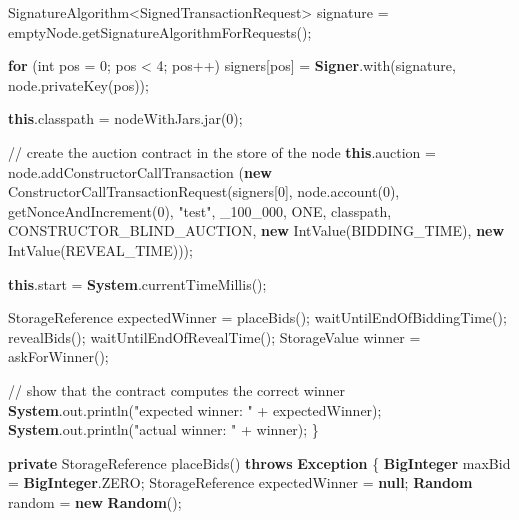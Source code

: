\documentclass[a4paper,]{book}
\newenvironment{Shaded}{\begin{snugshade}}{\end{snugshade}}
\newcommand{\BuiltInTok}[1]{\textcolor[rgb]{0.39,0.29,0.61}{\textbf{#1}}}
\newcommand{\CommentTok}[1]{\textcolor[rgb]{0.54,0.53,0.53}{#1}}
\newcommand{\DataTypeTok}[1]{\textcolor[rgb]{0.00,0.34,0.68}{#1}}
\newcommand{\DecValTok}[1]{\textcolor[rgb]{0.69,0.50,0.00}{#1}}
\newcommand{\FunctionTok}[1]{\textcolor[rgb]{0.39,0.29,0.61}{#1}}
\newcommand{\KeywordTok}[1]{\textcolor[rgb]{0.12,0.11,0.11}{\textbf{#1}}}
\newcommand{\NormalTok}[1]{\textcolor[rgb]{0.12,0.11,0.11}{#1}}
\newcommand{\StringTok}[1]{\textcolor[rgb]{0.75,0.01,0.01}{#1}}
\renewenvironment{Shaded}{\begin{snugshade}\small}{\end{snugshade}}
\begin{document}
{\begin{Shaded}
\begin{Highlighting}[]
\NormalTok{    SignatureAlgorithm<SignedTransactionRequest> signature}
\NormalTok{      = emptyNode.}\FunctionTok{getSignatureAlgorithmForRequests}\NormalTok{();}

    \KeywordTok{for}\NormalTok{ (}\DataTypeTok{int}\NormalTok{ pos = }\DecValTok{0}\NormalTok{; pos < }\DecValTok{4}\NormalTok{; pos++)}
\NormalTok{      signers[pos] = }\BuiltInTok{Signer}\NormalTok{.}\FunctionTok{with}\NormalTok{(signature, node.}\FunctionTok{privateKey}\NormalTok{(pos));}

    \KeywordTok{this}\NormalTok{.}\FunctionTok{classpath}\NormalTok{ = nodeWithJars.}\FunctionTok{jar}\NormalTok{(}\DecValTok{0}\NormalTok{);}

    \CommentTok{// create the auction contract in the store of the node}
    \KeywordTok{this}\NormalTok{.}\FunctionTok{auction}\NormalTok{ = node.}\FunctionTok{addConstructorCallTransaction}
\NormalTok{      (}\KeywordTok{new} \FunctionTok{ConstructorCallTransactionRequest}\NormalTok{(signers[}\DecValTok{0}\NormalTok{], node.}\FunctionTok{account}\NormalTok{(}\DecValTok{0}\NormalTok{),}
       \FunctionTok{getNonceAndIncrement}\NormalTok{(}\DecValTok{0}\NormalTok{), }\StringTok{"test"}\NormalTok{, _}\DecValTok{100_000}\NormalTok{, ONE,}
\NormalTok{       classpath, CONSTRUCTOR_BLIND_AUCTION,}
       \KeywordTok{new} \FunctionTok{IntValue}\NormalTok{(BIDDING_TIME), }\KeywordTok{new} \FunctionTok{IntValue}\NormalTok{(REVEAL_TIME)));}

    \KeywordTok{this}\NormalTok{.}\FunctionTok{start}\NormalTok{ = }\BuiltInTok{System}\NormalTok{.}\FunctionTok{currentTimeMillis}\NormalTok{();}

\NormalTok{    StorageReference expectedWinner = }\FunctionTok{placeBids}\NormalTok{();}
    \FunctionTok{waitUntilEndOfBiddingTime}\NormalTok{();}
    \FunctionTok{revealBids}\NormalTok{();}
    \FunctionTok{waitUntilEndOfRevealTime}\NormalTok{();}
\NormalTok{    StorageValue winner = }\FunctionTok{askForWinner}\NormalTok{();}

    \CommentTok{// show that the contract computes the correct winner}
    \BuiltInTok{System}\NormalTok{.}\FunctionTok{out}\NormalTok{.}\FunctionTok{println}\NormalTok{(}\StringTok{"expected winner: "}\NormalTok{ + expectedWinner);}
    \BuiltInTok{System}\NormalTok{.}\FunctionTok{out}\NormalTok{.}\FunctionTok{println}\NormalTok{(}\StringTok{"actual winner: "}\NormalTok{ + winner);}
\NormalTok{  \}}

\KeywordTok{private}\NormalTok{ StorageReference }\FunctionTok{placeBids}\NormalTok{() }\KeywordTok{throws} \BuiltInTok{Exception}\NormalTok{ \{}
    \BuiltInTok{BigInteger}\NormalTok{ maxBid = }\BuiltInTok{BigInteger}\NormalTok{.}\FunctionTok{ZERO}\NormalTok{;}
\NormalTok{    StorageReference expectedWinner = }\KeywordTok{null}\NormalTok{;}
    \BuiltInTok{Random}\NormalTok{ random = }\KeywordTok{new} \BuiltInTok{Random}\NormalTok{();}


\end{Highlighting}
\end{Shaded}}
\end{document}
